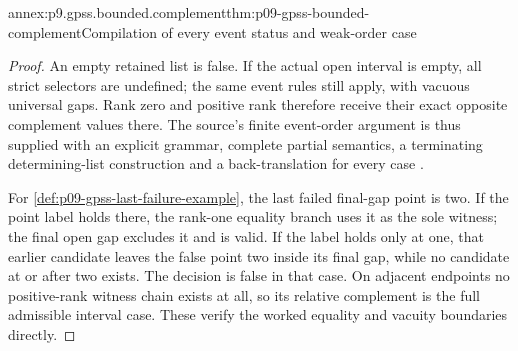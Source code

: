 \begin{annexitem}{annex:p9.gpss.bounded.complement}{thm:p09-gpss-bounded-complement}{Compilation of every event status and weak-order case}
\begin{proof}
An empty retained list is
false. If the actual open
interval is empty, all strict
selectors are undefined; the
same event rules still apply,
with vacuous universal gaps.
Rank zero and positive rank
therefore receive their exact
opposite complement values
there. The source's finite
event-order argument is thus
supplied with an explicit
grammar, complete partial
semantics, a terminating
determining-list construction
and a back-translation for
every case
\cite[Proposition~2.4 outline,
       p.~171]{GabbayPnueliShelahStavi1980}.

For \cref{def:p09-gpss-last-failure-example},
the last failed final-gap point
is two. If the point label
holds there, the rank-one
equality branch uses it as
the sole witness; the final
open gap excludes it and is
valid. If the label holds
only at one, that earlier
candidate leaves the false
point two inside its final
gap, while no candidate at
or after two exists. The
decision is false in that
case. On adjacent endpoints
no positive-rank witness
chain exists at all, so its
relative complement is the
full admissible interval
case. These verify the
worked equality and vacuity
boundaries directly.
\end{proof}
\end{annexitem}

